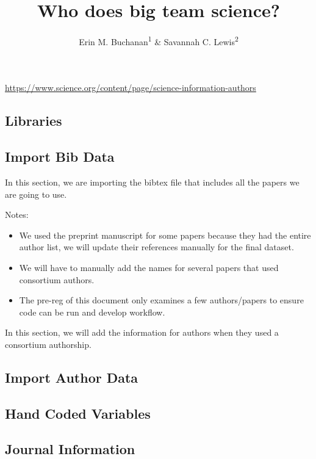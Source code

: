 \documentclass[
  english,
  man]{apa6}
\title{Who does big team science?}
\author{Erin M. Buchanan\textsuperscript{1} \& Savannah C. Lewis\textsuperscript{2}}
\date{}
\affiliation{\vspace{0.5cm}\textsuperscript{1} Harrisburg University of Science and Technology\\\textsuperscript{2} University of Alabama}
\providecommand{\tightlist}{%
  \setlength{\itemsep}{0pt}\setlength{\parskip}{0pt}}
\begin{document}
\maketitle

\url{https://www.science.org/content/page/science-information-authors}

\hypertarget{libraries}{%
\subsection{Libraries}\label{libraries}}

\hypertarget{import-bib-data}{%
\subsection{Import Bib Data}\label{import-bib-data}}

In this section, we are importing the bibtex file that includes all the papers we are going to use.

Notes:

\begin{itemize}
\tightlist
\item
  We used the preprint manuscript for some papers because they had the entire author list, we will update their references manually for the final dataset.
\item
  We will have to manually add the names for several papers that used consortium authors.
\item
  The pre-reg of this document only examines a few authors/papers to ensure code can be run and develop workflow.
\end{itemize}

In this section, we will add the information for authors when they used a consortium authorship.

\hypertarget{import-author-data}{%
\subsection{Import Author Data}\label{import-author-data}}

\hypertarget{hand-coded-variables}{%
\subsection{Hand Coded Variables}\label{hand-coded-variables}}

\hypertarget{journal-information}{%
\subsection{Journal Information}\label{journal-information}}
\end{document}
